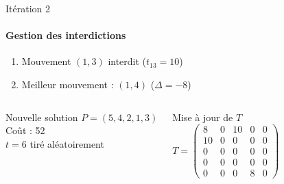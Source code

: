 \documentclass[10pt, handout]{beamer}
\begin{document}
\begin{frame}{Itération 2 }
    \framesubtitle{Gestion des interdictions}


    \begin{enumerate}
        \item Mouvement \( (1,3) \) interdit (\( t_{13} = 10 \))
        \item Meilleur mouvement : \( (1,4) \) (\( \Delta = -8 \))
    \end{enumerate}

    \begin{columns}
        \begin{alertblock}{Nouvelle solution}
            \( P = (5, 4, 2, 1, 3) \) \\
            Coût : 52 \\
            \( t = 6 \) tiré aléatoirement
        \end{alertblock}

        \begin{exampleblock}{Mise à jour de \( T \)}
            \[
                T = \begin{pmatrix}
                    8  & 0 & 10 & 0 & 0 \\
                    10 & 0 & 0  & 0 & 0 \\
                    0  & 0 & 0  & 0 & 0 \\
                    0  & 0 & 0  & 0 & 0 \\
                    0  & 0 & 0  & 8 & 0
                \end{pmatrix}
            \]
        \end{exampleblock}
    \end{columns}
\end{frame}
\end{document}
